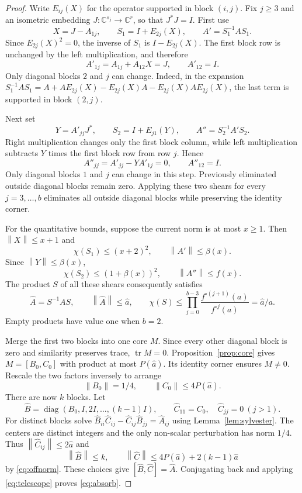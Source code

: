 \documentclass[11pt]{article}
\theoremstyle{remark}
\newcommand{\C}{\mathbb C}
\newcommand{\tr}{\operatorname{tr}}
\newcommand{\diag}{\operatorname{diag}}
\newcommand{\norm}[1]{\left\lVert#1\right\rVert}
\newcommand{\comm}[2]{[#1,#2]}
\numberwithin{equation}{section}
\begin{document}
\begin{proof}
Write $E_{ij}(X)$ for the operator supported in block $(i,j)$. Fix $j\ge3$ and
an isometric embedding $J:\C^{s_j}\longrightarrow\C^r$, so that $J^*J=I$.
First use
\[
 X=J-A_{1j},\qquad S_1=I+E_{2j}(X),\qquad A'=S_1^{-1}AS_1.
\]
Since $E_{2j}(X)^2=0$, the inverse of $S_1$ is $I-E_{2j}(X)$. The first block
row is unchanged by the left multiplication, and therefore
\[
 A'_{1j}=A_{1j}+A_{12}X=J,\qquad A'_{12}=I.
\]
Only diagonal blocks $2$ and $j$ can change. Indeed, in the expansion
$S_1^{-1}AS_1=A+AE_{2j}(X)-E_{2j}(X)A-E_{2j}(X)AE_{2j}(X)$,
the last term is supported in block $(2,j)$.

Next set
\[
 Y=A'_{jj}J^*,\qquad S_2=I+E_{j1}(Y),\qquad A''=S_2^{-1}A'S_2.
\]
Right multiplication changes only the first block column, while left
multiplication subtracts $Y$ times the first block row from row $j$. Hence
\begin{equation}\label{eq:shearzero}
 A''_{jj}=A'_{jj}-YA'_{1j}=0,\qquad A''_{12}=I.
\end{equation}
Only diagonal blocks $1$ and $j$ can change in this step. Previously eliminated
outside diagonal blocks remain zero. Applying these two shears for every
$j=3,\ldots,b$ eliminates all outside diagonal blocks while preserving the
identity corner.

For the quantitative bounds, suppose the current norm is at most $x\ge1$.
Then $\norm X\le x+1$ and
\[
 \chi(S_1)\le(x+2)^2,\qquad \norm{A'}\le\beta(x).
\]
Since $\norm Y\le\beta(x)$,
\[
 \chi(S_2)\le(1+\beta(x))^2,\qquad \norm{A''}\le f(x).
\]
The product $S$ of all these shears consequently satisfies
\begin{equation}\label{eq:telescope}
 \widehat A=S^{-1}AS,\qquad
 \norm{\widehat A}\le\widehat a,\qquad
 \chi(S)\le\prod_{j=0}^{b-3}
 \frac{f^{\circ(j+1)}(a)}{f^{\circ j}(a)}=\widehat a/a.
\end{equation}
Empty products have value one when $b=2$.

Merge the first two blocks into one core $M$. Since every other diagonal block
is zero and similarity preserves trace, $\tr M=0$. Proposition~\ref{prop:core}
gives $M=\comm{B_0}{C_0}$ with product at most $P(\widehat a)$. Its identity
corner ensures $M\ne0$. Rescale the two factors inversely to arrange
\[
 \norm{B_0}=1/4,\qquad \norm{C_0}\le4P(\widehat a).
\]
There are now $k$ blocks. Let
\[
 \widehat B=\diag(B_0,I,2I,\ldots,(k-1)I),\qquad
 \widehat C_{11}=C_0,\quad \widehat C_{jj}=0\ (j>1).
\]
For distinct blocks solve
$\widehat B_{ii}\widehat C_{ij}-\widehat C_{ij}\widehat B_{jj}=\widehat A_{ij}$
using Lemma~\ref{lem:sylvester}. The centers are distinct integers and the only
non-scalar perturbation has norm $1/4$. Thus
$\norm{\widehat C_{ij}}\le2\widehat a$ and
\[
 \norm{\widehat B}\le k,\qquad
 \norm{\widehat C}\le4P(\widehat a)+2(k-1)\widehat a
\]
by \eqref{eq:offnorm}. These choices give
$\comm{\widehat B}{\widehat C}=\widehat A$. Conjugating back and applying
\eqref{eq:telescope} proves \eqref{eq:absorb}.
\end{proof}
\end{document}
